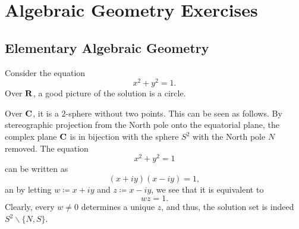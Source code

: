 \chapter{Algebraic Geometry Exercises}
\section{Elementary Algebraic Geometry}
\begin{example}
Consider the equation
\[
x^2+y^2=1.
\]
Over $\mathbf{R}$, a good picture of the solution is a circle.

Over $\mathbf{C}$, it is a $2$-sphere without two points. This can be seen as
follows. By stereographic projection from the North pole onto the
equatorial plane, the complex plane $\mathbf{C}$ is in bijection with the sphere
$S^2$ with the North pole $N$ removed. The equation
\[
x^2+y^2=1
\]
can be written as
\[
(x+iy)(x-iy)=1,
\]
an by letting $w\coloneqq x+iy$ and $z\coloneqq x-iy$, we see that
it is equivalent to
\[
wz=1.
\]
Clearly, every $w\neq 0$ determines a unique $z$, and thus, the solution
set is indeed $S^2\smallsetminus\{N,S\}$.
\end{example}

